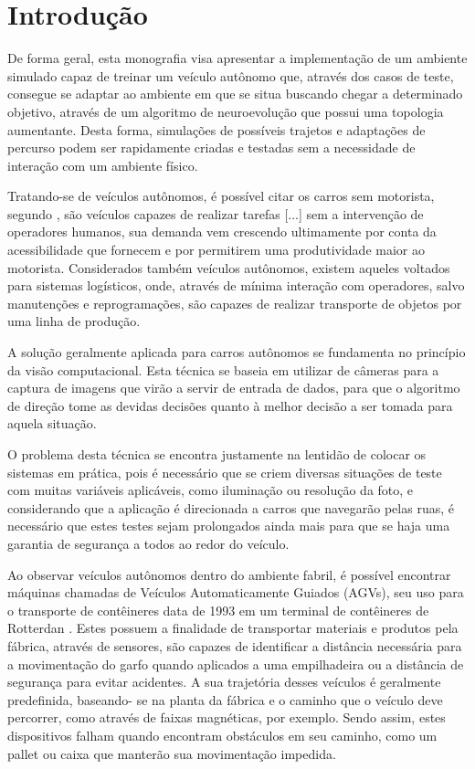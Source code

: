 \chapter{Introdução}

De forma geral, esta monografia visa apresentar a implementação de um
ambiente simulado capaz de treinar um veículo autônomo que, através dos
casos de teste, consegue se adaptar ao ambiente em que se situa buscando
chegar a determinado objetivo, através de um algoritmo de neuroevolução que
possui uma topologia aumentante. Desta forma, simulações de possíveis trajetos
e adaptações de percurso podem ser rapidamente criadas e testadas sem a
necessidade de interação com um ambiente físico.

Tratando-se de veículos autônomos, é possível citar os carros sem
motorista, segundo , são veículos capazes de realizar tarefas
[...] sem a intervenção de operadores humanos, sua demanda vem crescendo
ultimamente por conta da acessibilidade que fornecem e por permitirem uma
produtividade maior ao motorista. Considerados também veículos autônomos,
existem aqueles voltados para sistemas logísticos, onde, através de mínima
interação com operadores, salvo manutenções e reprogramações, são capazes
de realizar transporte de objetos por uma linha de produção.

A solução geralmente aplicada para carros autônomos se fundamenta no
princípio da visão computacional. Esta técnica se baseia em utilizar de câmeras
para a captura de imagens que virão a servir de entrada de dados, para que o
algoritmo de direção tome as devidas decisões quanto à melhor decisão a ser
tomada para aquela situação.

O problema desta técnica se encontra justamente na lentidão de colocar
os sistemas em prática, pois é necessário que se criem diversas situações de
teste com muitas variáveis aplicáveis, como iluminação ou resolução da foto, e
considerando que a aplicação é direcionada a carros que navegarão pelas ruas,
é necessário que estes testes sejam prolongados ainda mais para que se haja
uma garantia de segurança a todos ao redor do veículo.

Ao observar veículos autônomos dentro do ambiente fabril, é possível
encontrar máquinas chamadas de Veículos Automaticamente Guiados (AGVs),
seu uso para o transporte de contêineres data de 1993 em um terminal de
contêineres de Rotterdan \cite{saputra2021}. Estes possuem a finalidade
de transportar materiais e produtos pela fábrica, através de sensores, são
capazes de identificar a distância necessária para a movimentação do garfo
quando aplicados a uma empilhadeira ou a distância de segurança para evitar
acidentes. A sua trajetória desses veículos é geralmente predefinida, baseando-
se na planta da fábrica e o caminho que o veículo deve percorrer, como através
de faixas magnéticas, por exemplo. Sendo assim, estes dispositivos falham
quando encontram obstáculos em seu caminho, como um pallet ou caixa que
manterão sua movimentação impedida.

